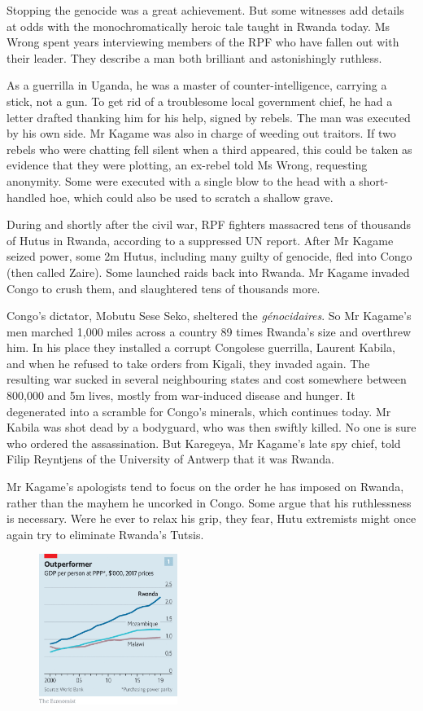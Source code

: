 \documentclass{article}
\begin{document}
Stopping the genocide was a great achievement. But some witnesses add details at odds with the monochromatically heroic tale taught in Rwanda today. Ms Wrong spent years interviewing members of the RPF who have fallen out with their leader. They describe a man both brilliant and astonishingly ruthless. 

As a guerrilla in Uganda, he was a master of counter-intelligence, carrying a stick, not a gun. To get rid of a troublesome local government chief, he had a letter drafted thanking him for his help, signed by rebels. The man was executed by his own side. Mr Kagame was also in charge of weeding out traitors. If two rebels who were chatting fell silent when a third appeared, this could be taken as evidence that they were plotting, an ex-rebel told Ms Wrong, requesting anonymity. Some were executed with a single blow to the head with a short-handled hoe, which could also be used to scratch a shallow grave. 

During and shortly after the civil war, RPF fighters massacred tens of thousands of Hutus in Rwanda, according to a suppressed UN report. After Mr Kagame seized power, some 2m Hutus, including many guilty of genocide, fled into Congo (then called Zaire). Some launched raids back into Rwanda. Mr Kagame invaded Congo to crush them, and slaughtered tens of thousands more. 

Congo's dictator, Mobutu Sese Seko, sheltered the \emph{génocidaires}. So Mr Kagame's men marched 1,000 miles across a country 89 times Rwanda's size and overthrew him. In his place they installed a corrupt Congolese guerrilla, Laurent Kabila, and when he refused to take orders from Kigali, they invaded again. The resulting war sucked in several neighbouring states and cost somewhere between 800,000 and 5m lives, mostly from war-induced disease and hunger. It degenerated into a scramble for Congo's minerals, which continues today. Mr Kabila was shot dead by a bodyguard, who was then swiftly killed. No one is sure who ordered the assassination. But Karegeya, Mr Kagame's late spy chief, told Filip Reyntjens of the University of Antwerp that it was Rwanda. 

Mr Kagame's apologists tend to focus on the order he has imposed on Rwanda, rather than the mayhem he uncorked in Congo. Some argue that his ruthlessness is necessary. Were he ever to relax his grip, they fear, Hutu extremists might once again try to eliminate Rwanda's Tutsis. 

\begin{figure}[h]
\centering
\includegraphics[width=0.4\textwidth]{images/20210327_MAC287.png}
\end{figure}
\end{document}
